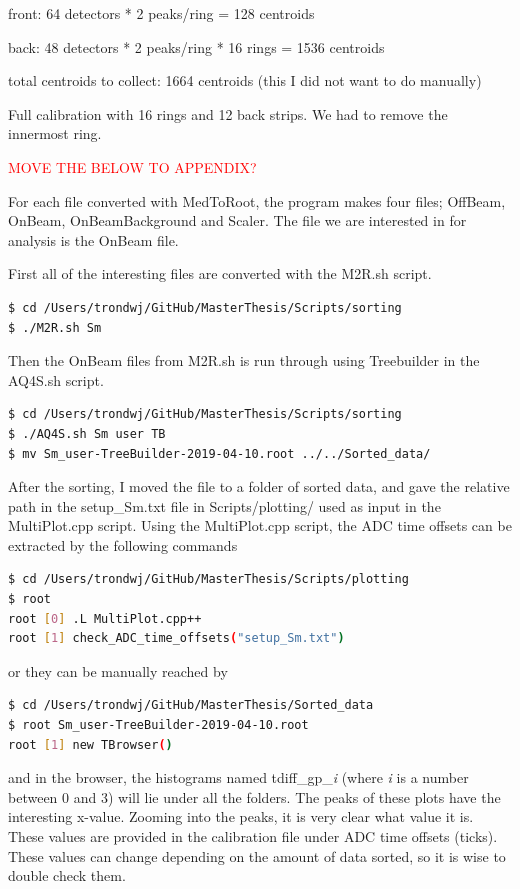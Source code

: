 \documentclass[twoside,english]{uiofysmaster/uiofysmaster}
\begin{document}
front: 64 detectors * 2 peaks/ring = 128 centroids

back: 48 detectors * 2 peaks/ring * 16 rings =  1536 centroids 

total centroids to collect: 1664 centroids (this I did not want to do manually)

Full calibration with 16 rings and 12 back strips. We had to remove the innermost ring. 



\textcolor{red}{MOVE THE BELOW TO APPENDIX?}

For each file converted with MedToRoot, the program makes four files; OffBeam, OnBeam, OnBeamBackground and Scaler. The file we are interested in for analysis is the OnBeam file. 

First all of the interesting files are converted with the M2R.sh script. 
\begin{lstlisting}[language=sh]
$ cd /Users/trondwj/GitHub/MasterThesis/Scripts/sorting 
$ ./M2R.sh Sm
\end{lstlisting}

Then the OnBeam files from M2R.sh is run through using Treebuilder in the AQ4S.sh script. 

\begin{lstlisting}[language=sh]
$ cd /Users/trondwj/GitHub/MasterThesis/Scripts/sorting 
$ ./AQ4S.sh Sm user TB
$ mv Sm_user-TreeBuilder-2019-04-10.root ../../Sorted_data/
\end{lstlisting}


After the sorting, I moved the file to a folder of sorted data, and gave the relative path in the setup\_Sm.txt file in Scripts/plotting/ used as input in the MultiPlot.cpp script. 
Using the MultiPlot.cpp script, the ADC time offsets can be extracted by the following commands
\begin{lstlisting}[language=sh]
$ cd /Users/trondwj/GitHub/MasterThesis/Scripts/plotting
$ root
root [0] .L MultiPlot.cpp++
root [1] check_ADC_time_offsets("setup_Sm.txt")
\end{lstlisting}
or they can be manually reached by
\begin{lstlisting}[language=sh]
$ cd /Users/trondwj/GitHub/MasterThesis/Sorted_data
$ root Sm_user-TreeBuilder-2019-04-10.root
root [1] new TBrowser()
\end{lstlisting}
and in the browser, the histograms named tdiff\_gp\_\textit{i} (where \textit{i} is a number between 0 and 3) will lie under all the folders. The peaks of these plots have the interesting x-value. Zooming into the peaks, it is very clear what value it is. These values are provided in the calibration file under ADC time offsets (ticks). These values can change depending on the amount of data sorted, so it is wise to double check them.
\end{document}
